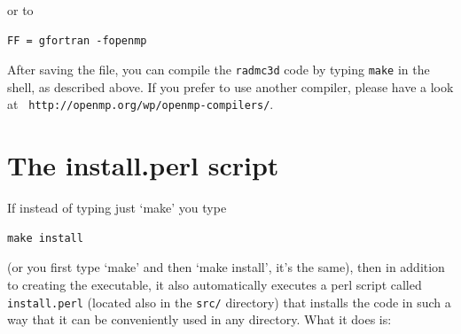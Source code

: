 \documentclass{report}
\begin{document}
or to
{\small\begin{verbatim}
FF = gfortran -fopenmp
\end{verbatim}}

After saving the file, you can compile the {\small\tt radmc3d} code by
typing {\small\tt make} in the shell, as described above. If you prefer to
use another compiler, please have a look at {\small\tt
  http://openmp.org/wp/openmp-compilers/}.

\section{The install.perl script}
If instead of typing just `make' you type
{\small\begin{verbatim}
make install
\end{verbatim}}
(or you first type `make' and then `make install', it's the same), then
in addition to creating the executable, it also automatically executes 
a perl script called
{\small\tt install.perl} (located also in the {\small\tt src/} directory) that installs
the code in such a way that it can be conveniently used in any
directory. What it does is:
\end{document}
